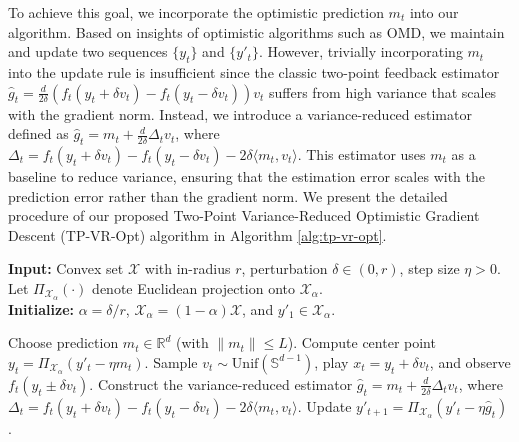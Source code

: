 \documentclass[journal,onecolumn]{IEEEtran}
\newcommand{\cX}{\mathcal{X}}
\theoremstyle{plain}
\theoremstyle{definition}
\theoremstyle{remark}
\newcommand{\tpvr}{{\sc TP-VR-Opt}}
\begin{document}
To achieve this goal, we incorporate the optimistic prediction $m_{t}$ into our
algorithm. Based on insights of optimistic algorithms such as OMD, we maintain and update two sequences $\{y_{t}\}$ and $\{y'_{t}\}$. However, trivially incorporating $m_t$ into the update rule is insufficient since
the classic two-point feedback estimator
$\hat{g}_{t}=\frac{d}{2\delta}\left(f_{t}(y_{t}+ \delta v_{t}) - f_{t}(y_{t}- \delta
v_{t})\right)v_{t}$
suffers from high variance that scales with the gradient norm. Instead, we introduce a variance-reduced
estimator defined as $\hat{g}_{t}= m_{t}+ \frac{d}{2\delta}\Delta_{t}v_{t}$, where
$\Delta_{t}= f_{t}(y_{t}+ \delta v_{t}) - f_{t}(y_{t}- \delta v_{t}) - 2\delta \langle
m_{t}, v_{t}\rangle$. This estimator uses $m_{t}$ as a baseline to reduce
variance, ensuring that the estimation error scales with the prediction error rather
than the gradient norm. We present the detailed procedure of our proposed Two-Point
Variance-Reduced Optimistic Gradient Descent (\tpvr) algorithm in 
Algorithm \ref{alg:tp-vr-opt}.

\begin{algorithm}
    [t]
    \caption{\textsc{TP-VR-Opt}}
    \label{alg:tp-vr-opt}

    \textbf{Input:} Convex set $\cX$ with in-radius $r$, perturbation
    $\delta \in (0, r)$, step size $\eta > 0$. Let $\Pi_{\cX_{\alpha}}(\cdot)$ denote
    Euclidean projection onto $\cX_{\alpha}$. \\
    \textbf{Initialize:} $\alpha = \delta/r$, $\cX_{\alpha}= (1-\alpha)\cX$, and
    $y'_{1}\in \cX_{\alpha}$.

    \begin{algorithmic}
        [1]  \STATE Choose prediction
        $m_{t}\in \mathbb{R}^{d}$ (with $\|m_{t}\| \le L$). \STATE Compute center
        point $y_{t}= \Pi_{\cX_\alpha}(y'_{t}- \eta m_{t})$. \STATE Sample
        $v_{t}\sim \mathrm{Unif}(\mathbb{S}^{d-1})$, play $x_{t}= y_{t}+ \delta v
        _{t}$, and observe $f_{t}(y_{t}\pm \delta v_{t})$. \STATE Construct the variance-reduced
        estimator $\hat{g}_{t}= m_{t}+ \frac{d}{2\delta}\Delta_{t}v_{t}$, where
        $\Delta_{t}= f_{t}(y_{t}+ \delta v_{t})-f_{t}(y_{t}- \delta v_{t}) - 2\delta
        \langle m_{t}, v_{t}\rangle$. \STATE Update $y'_{t+1}= \Pi_{\cX_\alpha}(y
        '_{t}- \eta \hat{g}_{t})$. \ENDFOR
    \end{algorithmic}
\end{algorithm}
\end{document}
